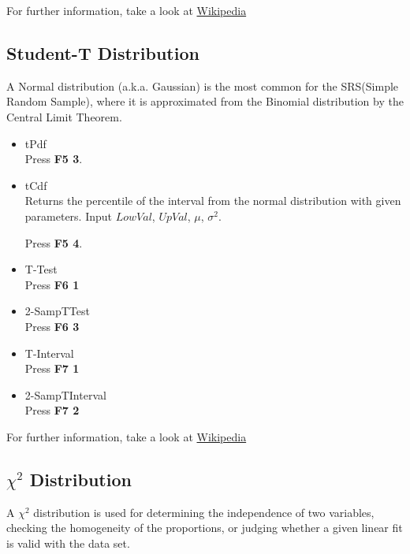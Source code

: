     For further information, take a look at \href{https://en.wikipedia.org/wiki/Normal_distribution}{Wikipedia}

\subsection{Student-T Distribution}
    A Normal distribution (a.k.a. Gaussian) is the most common for the SRS(Simple Random Sample), where it is approximated from the Binomial distribution by the Central Limit Theorem.

    \begin{itemize}
        \item tPdf\\
        Press \textbf{F5 3}.

        \item tCdf\\
        Returns the percentile of the interval from the normal distribution with given parameters. Input $LowVal$, $UpVal$, $\mu$, $\sigma^{2}$.

        Press \textbf{F5 4}.

        \item T-Test\\

        Press \textbf{F6 1}

        \item 2-SampTTest\\

        Press \textbf{F6 3}

        \item T-Interval\\

        Press \textbf{F7 1}

        \item 2-SampTInterval\\

        Press \textbf{F7 2}

    \end{itemize}

    For further information, take a look at \href{https://en.wikipedia.org/wiki/Student%27s_t-distribution}{Wikipedia}

\subsection{$\chi^{2}$ Distribution}
    A $\chi^{2}$ distribution is used for determining the independence of two variables, checking the homogeneity of the proportions, or judging whether a given linear fit is valid with the data set.
    
